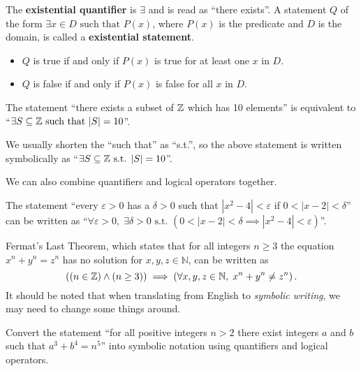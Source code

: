 \begin{definition}
    The \textbf{existential quantifier} is $\exists$ and is read as ``there exists''. A statement $Q$ of the form $\exists x \in D \textrm{ such that } P(x)$, where $P(x)$ is the predicate and $D$ is the domain, is called a \textbf{existential statement}.
    \begin{itemize}
        \item $Q$ is true if and only if $P(x)$ is true for at least one $x$ in $D$.
        \item $Q$ is false if and only if $P(x)$ is false for all $x$ in $D$.
    \end{itemize}
\end{definition}
\begin{example}
    The statement ``there exists a subset of $\mathbb{Z}$ which has 10 elements'' is equivalent to ``$\exists S \subseteq \mathbb{Z} \text{ such that } |S| = 10$''.
\end{example}
\begin{remark}
    We usually shorten the ``such that'' as ``s.t.'', so the above statement is written symbolically as ``$\exists S \subseteq \mathbb{Z} \text{ s.t. } |S| = 10$''.
\end{remark}

We can also combine quantifiers and logical operators together.
\begin{example}
    The statement ``every $\varepsilon > 0$ has a $\delta > 0$ such that $|x^2 - 4| < \varepsilon$ if $0 < |x - 2| < \delta$'' can be written as ``$\forall \varepsilon > 0,\;\exists \delta > 0 \text{ s.t. } (0 < |x - 2| < \delta \implies |x^2 - 4| < \varepsilon)$''.
\end{example}
\begin{example}
    Fermat's Last Theorem, which states that for all integers $n\geq 3$ the equation $x^n + y^n = z^n$ has no solution for $x, y, z \in \mathbb{N}$, can be written as
    \[
        \left((n \in \mathbb{Z}) \land (n \geq 3)\right) \implies \left(\forall x, y, z \in \mathbb{N},\; x^n + y^n \neq z^n\right).
    \]
    It should be noted that when translating from English to \textit{symbolic writing}, we may need to change some things around.
\end{example}

\begin{exercise}
    Convert the statement ``for all positive integers $n > 2$ there exist integers $a$ and $b$ such that $a^3 + b^4 = n^5$'' into symbolic notation using quantifiers and logical operators.
\end{exercise}

